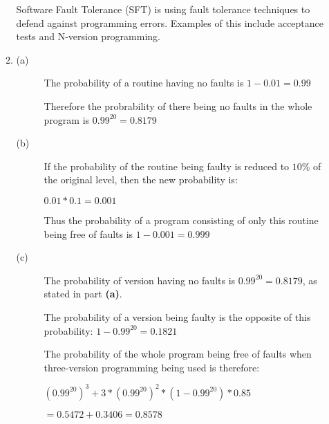 \documentclass[a4paper,12pt]{article}
\begin{document}
\begin{enumerate}
\begin{enumerate}
                Software Fault Tolerance (SFT) is using fault tolerance techniques to defend against programming errors. Examples of this include acceptance tests and N-version programming.

                \item
                    \begin{description}
                        \item[(a)] The probability of a routine having no faults is $1 - 0.01 = 0.99$

                        Therefore the probrability of there being no faults in the whole program is $0.99^{20} = 0.8179$

                        \item[(b)] If the probability of the routine being faulty is reduced to $10\%$ of the original level, then the new probability is:

                        $0.01 * 0.1 = 0.001$

                        Thus the probability of a program consisting of only this routine being free of faults is $1 - 0.001 = 0.999$

                        \item[(c)] The probability of version having no faults is $0.99^{20} = 0.8179$, as stated in part \textbf{(a)}.

                        The probability of a version being faulty is the opposite of this probability: $1 - 0.99^{20} = 0.1821$

                        The probability of the whole program being free of faults when three-version programming being used is therefore:

                        $(0.99^{20})^3 + 3 * (0.99^{20})^2 * (1 - 0.99^{20}) * 0.85$

                        $= 0.5472 + 0.3406 = 0.8578$
                    \end{description}
            \end{enumerate}

    \end{enumerate}
\end{document}
